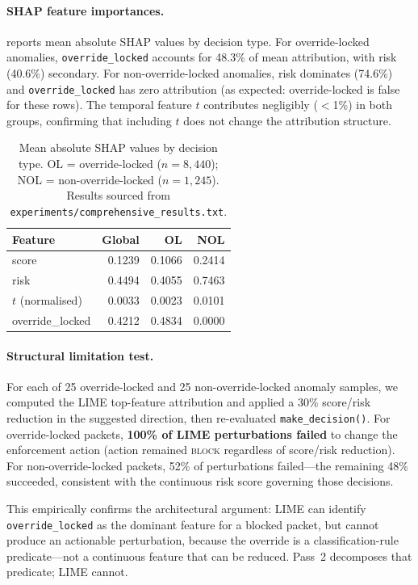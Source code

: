 \documentclass[preprint,12pt,authoryear]{elsarticle}
\begin{document}
\paragraph{SHAP feature importances.}
 reports mean absolute SHAP values by decision type.
For override-locked anomalies, \texttt{override\_locked} accounts for 48.3\% of
mean attribution, with risk (40.6\%) secondary. For non-override-locked anomalies,
risk dominates (74.6\%) and \texttt{override\_locked} has zero attribution (as
expected: override-locked is false for these rows). The temporal feature $t$
contributes negligibly ($<$1\%) in both groups, confirming that including $t$
does not change the attribution structure.

\begin{table}[htb]
\caption{Mean absolute SHAP values by decision type. OL = override-locked
  ($n=8{,}440$); NOL = non-override-locked ($n=1{,}245$).
  Results sourced from \texttt{experiments/comprehensive\_results.txt}.}
\label{tab:shap_importances}
\centering
\begin{tabular}{lrrr}
\toprule
\textbf{Feature} & \textbf{Global} & \textbf{OL} & \textbf{NOL} \\
\midrule
score              & 0.1239 & 0.1066 & 0.2414 \\
risk               & 0.4494 & 0.4055 & 0.7463 \\
$t$ (normalised)   & 0.0033 & 0.0023 & 0.0101 \\
override\_locked   & 0.4212 & 0.4834 & 0.0000 \\
\bottomrule
\end{tabular}
\end{table}

\paragraph{Structural limitation test.}
For each of 25 override-locked and 25 non-override-locked anomaly samples, we
computed the LIME top-feature attribution and applied a 30\% score/risk reduction
in the suggested direction, then re-evaluated \texttt{make\_decision()}.
For override-locked packets, \textbf{100\% of LIME perturbations failed} to change
the enforcement action (action remained \textsc{block} regardless of score/risk
reduction). For non-override-locked packets, 52\% of perturbations failed---the
remaining 48\% succeeded, consistent with the continuous risk score governing
those decisions.

This empirically confirms the architectural argument: LIME can identify
\texttt{override\_locked} as the dominant feature for a blocked packet, but
cannot produce an actionable perturbation, because the override is a
classification-rule predicate---not a continuous feature that can be reduced.
Pass~2 decomposes that predicate; LIME cannot.
\end{document}
